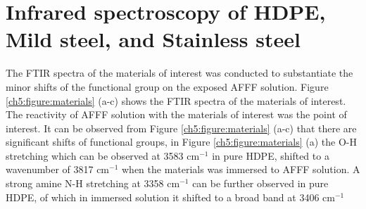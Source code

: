 \documentclass[12pt]{report}
\begin{document}
\section{Infrared spectroscopy of HDPE, Mild steel, and Stainless steel}  
The FTIR spectra of the materials of interest was conducted to substantiate the minor shifts of the functional group on the exposed AFFF solution. Figure \ref{ch5:figure:materials} (a-c) shows the FTIR spectra of the materials of interest. The reactivity of AFFF solution with the materials of interest was the point of interest. It can be observed from Figure \ref{ch5:figure:materials} (a-c) that there are significant shifts of functional groups, in Figure \ref{ch5:figure:materials} (a) the O-H stretching which can be observed at 3583 cm$^{-1}$ in pure HDPE, shifted to a wavenumber of 3817 cm$^{-1}$ when the materials was immersed to AFFF solution. A strong amine N-H stretching at 3358 cm$^{-1}$ can be further observed in pure HDPE, of which in immersed solution it shifted to a broad band at 3406 cm$^{-1}$
\end{document}

